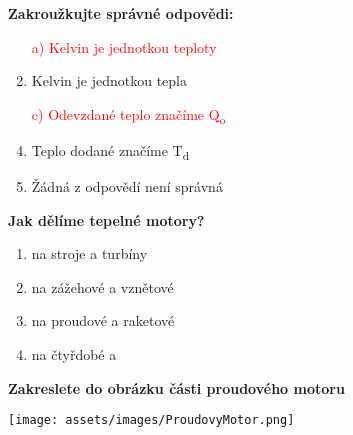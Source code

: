 \documentclass[../main.tex]{subfiles}
\begin{document}
\begin{enumerate}[label={\textbf{\arabic*.}}]
\begin{minipage}{0.45\textwidth}
    \item \textbf{Zakroužkujte správné odpovědi:}
        \begin{enumerate}[label={\alph*)}, itemsep=0pt, topsep=0.15cm]
            \item[\textcolor{red}{a)}] \textcolor{red}{{Kelvin je jednotkou teploty}}
            \item {Kelvin je jednotkou tepla}
            \item[\textcolor{red}{c)}] \textcolor{red}{{Odevzdané teplo značíme Q\textsubscript{o}}}
            \item {Teplo dodané značíme T\textsubscript{d}}
            \item {Žádná z odpovědí není správná}
        \end{enumerate}
    
    \item \textbf{Jak dělíme tepelné motory?}
        \begin{enumerate}[label={\alph*)}, itemsep=0pt, topsep=0.15cm]
            \item {}\tecky{2cm} na \tecky{1cm} stroje a \tecky{1cm} turbíny
            \item {}\tecky{2cm} na zážehové a vznětové
            \item {}\tecky{2cm} na proudové a raketové
            \item {}\tecky{2cm} na čtyřdobé a \tecky{2cm}
        \end{enumerate}
\end{minipage}
\hfill
\begin{minipage}[t]{0.4\textwidth}
    \vspace{-12.4cm}

    \item \textbf{Zakreslete do obrázku části proudového motoru}
    
    \vspace{1.25cm}
    \begin{center}
    \texttt{[image: assets/images/ProudovyMotor.png]}
\end{center}
\end{minipage}
\end{enumerate}
\end{document}

